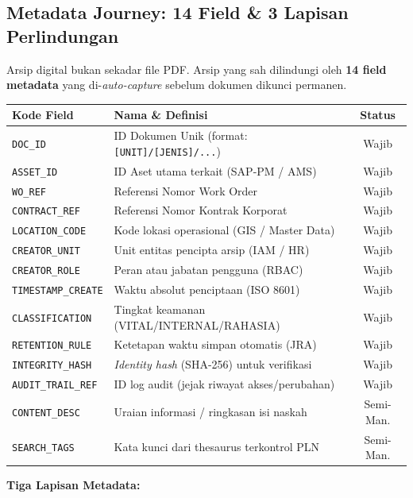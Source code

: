 \documentclass[11pt,a4paper]{article}
\begin{document}
\subsection{Metadata Journey: 14 Field \& 3 Lapisan Perlindungan}
Arsip digital bukan sekadar file PDF. Arsip yang sah dilindungi oleh \textbf{14 field metadata} yang di-\textit{auto-capture} sebelum dokumen dikunci permanen.

\begin{table}[h!]
\centering\scriptsize
\begin{tabularx}{\textwidth}{@{} l X c @{}}
\toprule
\textbf{Kode Field} & \textbf{Nama \& Definisi} & \textbf{Status} \\
\midrule
\texttt{DOC\_ID} & ID Dokumen Unik (format: \texttt{[UNIT]/[JENIS]/...}) & Wajib \\
\texttt{ASSET\_ID} & ID Aset utama terkait (SAP-PM / AMS) & Wajib \\
\texttt{WO\_REF} & Referensi Nomor Work Order & Wajib \\
\texttt{CONTRACT\_REF} & Referensi Nomor Kontrak Korporat & Wajib \\
\texttt{LOCATION\_CODE} & Kode lokasi operasional (GIS / Master Data) & Wajib \\
\texttt{CREATOR\_UNIT} & Unit entitas pencipta arsip (IAM / HR) & Wajib \\
\texttt{CREATOR\_ROLE} & Peran atau jabatan pengguna (RBAC) & Wajib \\
\texttt{TIMESTAMP\_CREATE} & Waktu absolut penciptaan (ISO 8601) & Wajib \\
\texttt{CLASSIFICATION} & Tingkat keamanan (VITAL/INTERNAL/RAHASIA) & Wajib \\
\texttt{RETENTION\_RULE} & Ketetapan waktu simpan otomatis (JRA) & Wajib \\
\texttt{INTEGRITY\_HASH} & \textit{Identity hash} (SHA-256) untuk verifikasi & Wajib \\
\texttt{AUDIT\_TRAIL\_REF} & ID log audit (jejak riwayat akses/perubahan) & Wajib \\
\midrule
\texttt{CONTENT\_DESC} & Uraian informasi / ringkasan isi naskah & Semi-Man. \\
\texttt{SEARCH\_TAGS} & Kata kunci dari thesaurus terkontrol PLN & Semi-Man. \\
\bottomrule
\end{tabularx}
\end{table}

\textbf{Tiga Lapisan Metadata:}
\end{document}
